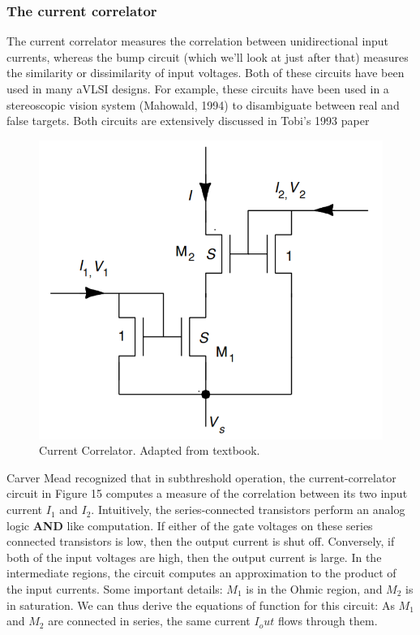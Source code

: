 \newpage
\subsubsection{The current correlator}

The current correlator measures the correlation between unidirectional input currents, whereas the bump circuit (which we'll look at just after that) measures the similarity or dissimilarity of input voltages. Both of these circuits have been used in many aVLSI designs. For example, these circuits have been used in a stereoscopic vision system
(Mahowald, 1994) to disambiguate between real and false targets. Both circuits are extensively discussed in Tobi's 1993 paper \cite{delbrueck1993bump}

\begin{figure}[H]
    \centering
    \includegraphics[width=0.5\linewidth]{../../Figures/Current_Correlator.PNG}
    \caption{Current Correlator. Adapted from textbook.}
    \label{fig:basalandcerebellum}
\end{figure}

Carver Mead recognized that in subthreshold operation, the current-correlator circuit
in Figure 15 computes a measure of the correlation between its two input current $I_1$ and $I_2$. Intuitively, the series-connected transistors perform an analog logic \textbf{AND} like computation. If either of the gate voltages on these series connected transistors is low, then the output current is shut off. Conversely, if both of the input voltages are high, then the output current is large. In the intermediate regions, the circuit computes an approximation to the product of the input currents. Some important details: $M_1$ is in the Ohmic region, and $M_2$ is in saturation. We can thus derive the equations of function for this circuit: As $M_1$ and $M_2$ are connected in series, the same current $I_out$ flows  through them. 

